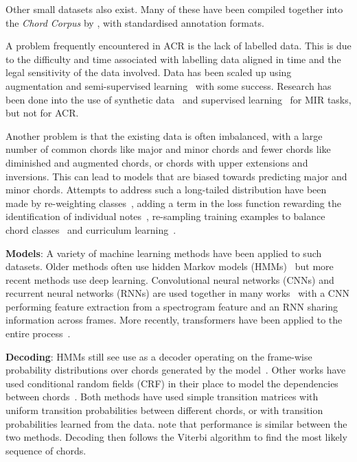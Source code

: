 Other small datasets also exist. Many of these have been compiled together into the \emph{Chord Corpus} by \citet{Choco}, with standardised annotation formats.

A problem frequently encountered in ACR is the lack of labelled data. This is due to the difficulty and time associated with labelling data aligned in time and the legal sensitivity of the data involved. Data has been scaled up using augmentation and semi-supervised learning~\citep{ScalingUpSemiSupervisedLearning} with some success. Research has been done into the use of synthetic data~\citep{MusicGenTrainingData,AnnotationFreeSyntheticData} and supervised learning~\citep{MERTSupervisedLearning} for MIR tasks, but not for ACR. 

Another problem is that the existing data is often imbalanced, with a large number of common chords like major and minor chords and fewer chords like diminished and augmented chords, or chords with upper extensions and inversions. This can lead to models that are biased towards predicting major and minor chords. Attempts to address such a long-tailed distribution have been made by re-weighting classes~\citep{ACRLargeVocab1}, adding a term in the loss function rewarding the identification of individual notes~\citep{StructuredTraining,ACRLargeVocab1}, re-sampling training examples to balance chord classes~\citep{BalanceRandomForestACR} and curriculum learning~\citep{CurriculumLearning}.

\textbf{Models}: A variety of machine learning methods have been applied to such datasets. Older methods often use hidden Markov models (HMMs)~\citep{ACRHMM} but more recent methods use deep learning. Convolutional neural networks (CNNs) and recurrent neural networks (RNNs) are used together in many works~\citep{ACRCNNRNN1,ACRLargeVocab1,StructuredTraining} with a CNN performing feature extraction from a spectrogram feature and an RNN sharing information across frames. More recently, transformers have been applied to the entire process~\citet{MelodyTranscriptionViaGenerativePreTraining, HarmonyTransformer, AttendToChords}.

\textbf{Decoding}: HMMs still see use as a decoder operating on the frame-wise probability distributions over chords generated by the model~\citep{BalanceRandomForestACR}. Other works have used conditional random fields (CRF) in their place to model the dependencies between chords~\citep{ACRLargeVocab1}. Both methods have used simple transition matrices with uniform transition probabilities between different chords, or with transition probabilities learned from the data. \citet{BalanceRandomForestACR} note that performance is similar between the two methods. Decoding then follows the Viterbi algorithm to find the most likely sequence of chords.

